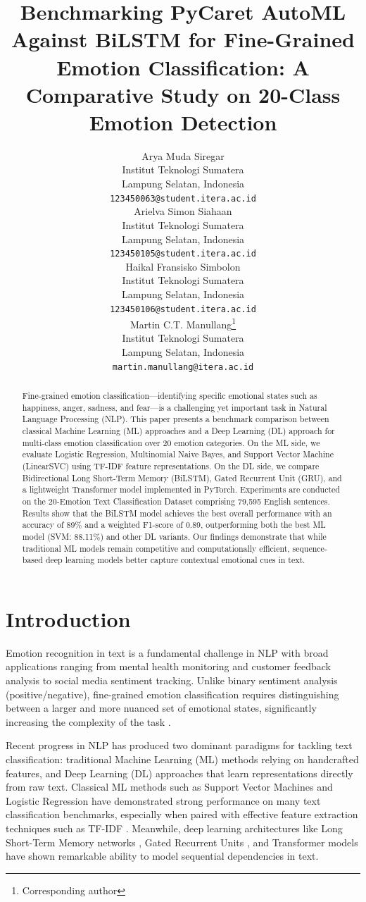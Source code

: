 \documentclass{article}
\title{Benchmarking PyCaret AutoML Against BiLSTM for Fine-Grained Emotion Classification: A Comparative Study on 20-Class Emotion Detection}
\author{
Arya Muda Siregar \\
Institut Teknologi Sumatera \\
Lampung Selatan, Indonesia \\
\texttt{123450063@student.itera.ac.id} \\
\And
Arielva Simon Siahaan \\
Institut Teknologi Sumatera \\
Lampung Selatan, Indonesia \\
\texttt{123450105@student.itera.ac.id} \\
\And
Haikal Fransisko Simbolon \\
Institut Teknologi Sumatera \\
Lampung Selatan, Indonesia \\
\texttt{123450106@student.itera.ac.id} \\
\AND
Martin C.T. Manullang\thanks{Corresponding author} \\
Institut Teknologi Sumatera \\
Lampung Selatan, Indonesia \\
\texttt{martin.manullang@itera.ac.id} \\
}
\begin{document}
\maketitle

\begin{abstract}
Fine-grained emotion classification—identifying specific emotional states such as happiness, anger, sadness, and fear—is a challenging yet important task in Natural Language Processing (NLP). This paper presents a benchmark comparison between classical Machine Learning (ML) approaches and a Deep Learning (DL) approach for multi-class emotion classification over 20 emotion categories. On the ML side, we evaluate Logistic Regression, Multinomial Naive Bayes, and Support Vector Machine (LinearSVC) using TF-IDF feature representations. On the DL side, we compare Bidirectional Long Short-Term Memory (BiLSTM), Gated Recurrent Unit (GRU), and a lightweight Transformer model implemented in PyTorch. Experiments are conducted on the 20-Emotion Text Classification Dataset comprising 79,595 English sentences. Results show that the BiLSTM model achieves the best overall performance with an accuracy of 89\% and a weighted F1-score of 0.89, outperforming both the best ML model (SVM: 88.11\%) and other DL variants. Our findings demonstrate that while traditional ML models remain competitive and computationally efficient, sequence-based deep learning models better capture contextual emotional cues in text.
\end{abstract}


\newpage
\section{Introduction}

Emotion recognition in text is a fundamental challenge in NLP with broad applications ranging from mental health monitoring and customer feedback analysis to social media sentiment tracking. Unlike binary sentiment analysis (positive/negative), fine-grained emotion classification requires distinguishing between a larger and more nuanced set of emotional states, significantly increasing the complexity of the task \cite{ekman1992emotions}.

Recent progress in NLP has produced two dominant paradigms for tackling text classification: traditional Machine Learning (ML) methods relying on handcrafted features, and Deep Learning (DL) approaches that learn representations directly from raw text. Classical ML methods such as Support Vector Machines and Logistic Regression have demonstrated strong performance on many text classification benchmarks, especially when paired with effective feature extraction techniques such as TF-IDF \cite{joachims1998text}. Meanwhile, deep learning architectures like Long Short-Term Memory networks \cite{hochreiter1997long}, Gated Recurrent Units \cite{cho2014gru}, and Transformer models \cite{vaswani2017attention} have shown remarkable ability to model sequential dependencies in text.
\end{document}
